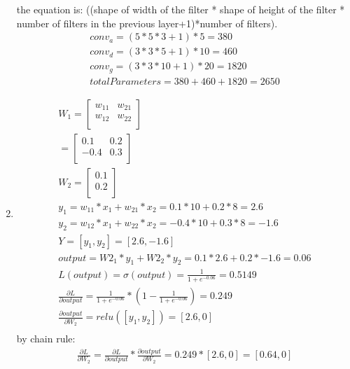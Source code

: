 \documentclass[12pt]{article}
\begin{document}
\begin{enumerate}
    the equation is: ((shape of width of the filter * shape of height of the filter * number of filters in the previous layer+1)*number of filters). 
    \begin{align}
    conv_a = (5 * 5 * 3  + 1) * 5 = 380 \\
    conv_d = (3 * 3 * 5  + 1) * 10 = 460 \\
    conv_g = (3 * 3 * 10 + 1) * 20 = 1820 \\
    totalParameters = 380 + 460 + 1820 = 2650
    \end{align}
\item 
    \begin{align}
      W_1 = \begin{bmatrix}
        w_{11} & w_{21}\\
        w_{12} & w_{22}\\
      \end{bmatrix} \\ = \begin{bmatrix}
        0.1 & 0.2\\
        -0.4 & 0.3\\
      \end{bmatrix} \\
    W_2 = \begin{bmatrix}
      0.1\\
      0.2\\
    \end{bmatrix} \\
    y_1 = w_{11} * x_1 + w_{21} * x_2 = 0.1 * 10 + 0.2 * 8 = 2.6 \\
    y_2 = w_{12} * x_1 + w_{22} * x_2 = -0.4 * 10 + 0.3 * 8 = -1.6 \\
    Y = [y_1, y_2] = [2.6, -1.6] \\
    output = W2_1 * y_1 + W2_2 * y_2 = 0.1 * 2.6 + 0.2 * -1.6 = 0.06 \\
    L(output) = \sigma(output) = \frac{1}{1 + e^{-0.06}} = 0.5149 \\
    \frac{\partial L}{\partial output} = \frac{1}{1 + e^{-0.06}} * (1 - \frac{1}{1 + e^{-0.06}}) = 0.249 \\
    \frac{\partial output}{\partial W_2} = relu([y_1, y_2]) = [2.6, 0] \\
    \end{align}
    by chain rule:
    \begin{align}
    \frac{\partial L}{\partial W_2} = \frac{\partial L}{\partial output} * \frac{\partial output}{\partial W_2} = 0.249 * [2.6, 0] = [0.64, 0]
    \end{align}

\end{enumerate}
\end{document}
